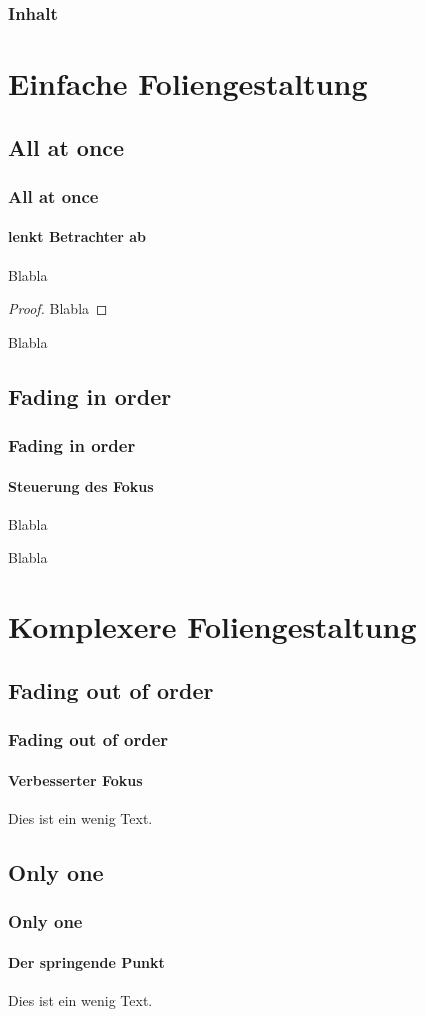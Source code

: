 \documentclass[ngerman]{beamer}
\begin{document}
\author{
  Ken Rieke \and Gregor Thill}
\date{\today}

\begin{frame}
  \titlepage
\end{frame}

\begin{frame}
  \frametitle{Inhalt}
  \tableofcontents[pausesections]
\end{frame}

\section{Einfache Foliengestaltung}
\subsection{All at once}
\begin{frame}
  \frametitle{All at once}
  \framesubtitle{lenkt Betrachter ab}
  \begin{theorem}
    Blabla
  \end{theorem}
  \begin{proof}
    Blabla
  \end{proof}
  \begin{lemma}
    Blabla
  \end{lemma}
\end{frame}

\subsection{Fading in order}
\begin{frame}
  \frametitle{Fading in order}
  \framesubtitle{Steuerung des Fokus}
  \begin{definition}
    Blabla
  \end{definition}
  \begin{example}
    Blabla
  \end{example}
\end{frame}

\section{Komplexere Foliengestaltung}
\subsection{Fading out of order}
\begin{frame}
  \frametitle{Fading out of order}
  \framesubtitle{Verbesserter Fokus}
  Dies ist ein wenig Text.
\end{frame}

\subsection{Only one}
\begin{frame}
  \frametitle{Only one}
  \framesubtitle{Der springende Punkt}
  Dies ist ein wenig Text.
\end{frame}
\end{document}
